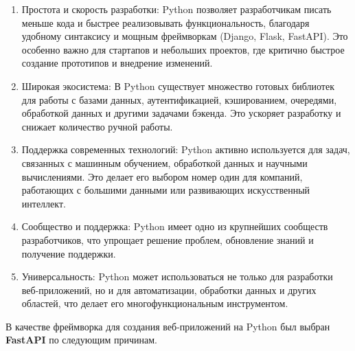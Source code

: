 \begin{enumerate}
	\item Простота и скорость разработки: Python позволяет разработчикам писать меньше кода и быстрее реализовывать функциональность, благодаря удобному синтаксису и мощным фреймворкам (Django, Flask, FastAPI). Это особенно важно для стартапов и небольших проектов, где критично быстрое создание прототипов и внедрение изменений.
	\item Широкая экосистема: В Python существует множество готовых библиотек для работы с базами данных, аутентификацией, кэшированием, очередями, обработкой данных и другими задачами бэкенда. Это ускоряет разработку и снижает количество ручной работы.
	\item Поддержка современных технологий: Python активно используется для задач, связанных с машинным обучением, обработкой данных и научными вычислениями. Это делает его выбором номер один для компаний, работающих с большими данными или развивающих искусственный интеллект.
	\item Сообщество и поддержка: Python имеет одно из крупнейших сообществ разработчиков, что упрощает решение проблем, обновление знаний и получение поддержки.
	\item Универсальность: Python может использоваться не только для разработки веб-приложений, но и для автоматизации, обработки данных и других областей, что делает его многофункциональным инструментом.
\end{enumerate}

В качестве фреймворка для создания веб-приложений на Python был выбран \textbf{FastAPI} \cite{fastapi} по следующим причинам.

